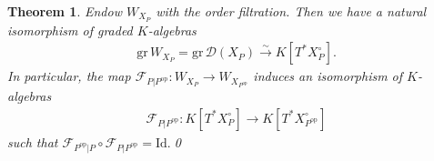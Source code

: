 \documentclass[11pt,a4paper,usenames,dvipsnames,reqno]{amsart}
\numberwithin{equation}{section}
\newtheorem{Thm}{Theorem}[section]
\theoremstyle{definition}
\theoremstyle{remark}
\begin{document}
\begin{Thm}\label{thm:filtration}
Endow $W_{X_P}$ with the order filtration. Then we have a natural isomorphism of graded $K$-algebras
\begin{align*}
    \mathrm{gr}\,W_{X_P}=\mathrm{gr}\, \mathcal{D}(X_P)\xrightarrow{\sim} K[T^\ast X_P^\circ].
\end{align*}
In particular, the map $\mathcal{F}_{P|P^{\mathrm{op}}}:W_{X_P}\longrightarrow W_{X_{P^{\mathrm{op}}}}$ induces an isomorphism of $K$-algebras
    \begin{align*}
    \mathcal{F}_{P|P^{\mathrm{op}}}:K[T^\ast X_P^\circ]\longrightarrow K[T^\ast X_{P^\mathrm{op}}^\circ]
\end{align*}
such that $\mathcal{F}_{P^{\mathrm{op}}|P}\circ \mathcal{F}_{P|P^{\mathrm{op}}}=\mathrm{Id}.$\qed
\end{Thm}
\end{document}
